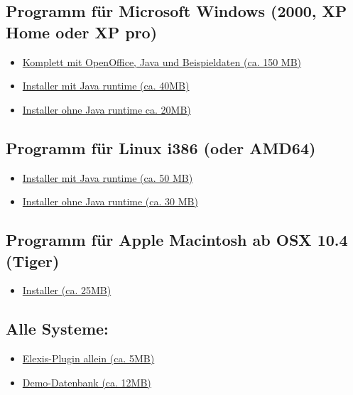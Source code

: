 \subsection{Programm für Microsoft Windows (2000, XP Home oder XP pro)}
\begin{itemize}
\item \href{http://www.elexis.ch/download.php?file=demo}{Komplett mit OpenOffice, Java und Beispieldaten (ca. 150 MB)}
\item \href{http://www.rgw.ch/download.php?file=elexis-jre-win32}{Installer mit Java runtime (ca. 40MB)}
\item \href{http://www.rgw.ch/download.php?file=elexis-win32}{Installer ohne Java runtime ca. 20MB)}
\end{itemize}

\subsection{Programm für Linux i386 (oder AMD64)}
\begin{itemize}
 \item \href{http://www.elexis.ch/download.php?file=elexis-linux-jre-i386}{Installer mit Java runtime (ca. 50 MB)}
\item \href{http://www.elexis.ch/download.php?file=elexis-linux-i386}{Installer ohne Java runtime (ca. 30 MB)}
\end{itemize}

\subsection{Programm für Apple Macintosh ab OSX 10.4 (Tiger)}
\begin{itemize}
 \item \href{http://www.elexis.ch/download.php?file=elexis-mac}{Installer (ca. 25MB)}
\end{itemize}

\subsection{Alle Systeme:}
\begin{itemize}
 \item \href{http://www.elexis.ch/download.php?file=elexis-plugin}{Elexis-Plugin allein (ca. 5MB)}
\item \href{http://www.elexis.ch/download.php?file=demodaten.zip}{Demo-Datenbank  (ca. 12MB) }
\end{itemize}

